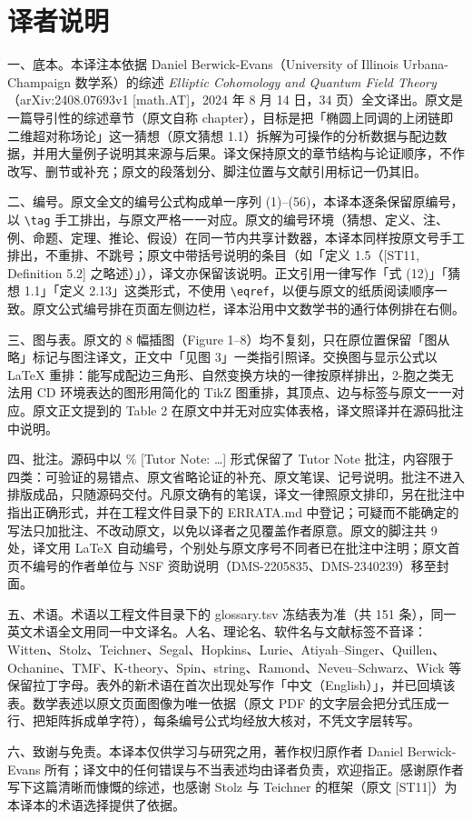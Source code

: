 \section*{译者说明}

一、底本。本译注本依据 Daniel Berwick-Evans（University of Illinois Urbana-Champaign 数学系）的综述 \textit{Elliptic Cohomology and Quantum Field Theory}（arXiv:2408.07693v1 [math.AT]，2024 年 8 月 14 日，34 页）全文译出。原文是一篇导引性的综述章节（原文自称 chapter），目标是把「椭圆上同调的上闭链即二维超对称场论」这一猜想（原文猜想 1.1）拆解为可操作的分析数据与配边数据，并用大量例子说明其来源与后果。译文保持原文的章节结构与论证顺序，不作改写、删节或补充；原文的段落划分、脚注位置与文献引用标记一仍其旧。

二、编号。原文全文的编号公式构成单一序列 (1)–(56)，本译本逐条保留原编号，以 \verb|\tag| 手工排出，与原文严格一一对应。原文的编号环境（猜想、定义、注、例、命题、定理、推论、假设）在同一节内共享计数器，本译本同样按原文号手工排出，不重排、不跳号；原文中带括号说明的条目（如「定义 1.5（[ST11, Definition 5.2] 之略述）」），译文亦保留该说明。正文引用一律写作「式 (12)」「猜想 1.1」「定义 2.13」这类形式，不使用 \verb|\eqref|，以便与原文的纸质阅读顺序一致。原文公式编号排在页面左侧边栏，译本沿用中文数学书的通行体例排在右侧。

三、图与表。原文的 8 幅插图（Figure 1–8）均不复刻，只在原位置保留「图从略」标记与图注译文，正文中「见图 3」一类指引照译。交换图与显示公式以 LaTeX 重排：能写成配边三角形、自然变换方块的一律按原样排出，2-胞之类无法用 CD 环境表达的图形用简化的 TikZ 图重排，其顶点、边与标签与原文一一对应。原文正文提到的 Table 2 在原文中并无对应实体表格，译文照译并在源码批注中说明。

四、批注。源码中以 \% [Tutor Note: …] 形式保留了 Tutor Note 批注，内容限于四类：可验证的易错点、原文省略论证的补充、原文笔误、记号说明。批注不进入排版成品，只随源码交付。凡原文确有的笔误，译文一律照原文排印，另在批注中指出正确形式，并在工程文件目录下的 ERRATA.md 中登记；可疑而不能确定的写法只加批注、不改动原文，以免以译者之见覆盖作者原意。原文的脚注共 9 处，译文用 LaTeX 自动编号，个别处与原文序号不同者已在批注中注明；原文首页不编号的作者单位与 NSF 资助说明（DMS-2205835、DMS-2340239）移至封面。

五、术语。术语以工程文件目录下的 glossary.tsv 冻结表为准（共 151 条），同一英文术语全文用同一中文译名。人名、理论名、软件名与文献标签不音译：Witten、Stolz、Teichner、Segal、Hopkins、Lurie、Atiyah–Singer、Quillen、Ochanine、TMF、K-theory、Spin、string、Ramond、Neveu–Schwarz、Wick 等保留拉丁字母。表外的新术语在首次出现处写作「中文（English）」，并已回填该表。数学表述以原文页面图像为唯一依据（原文 PDF 的文字层会把分式压成一行、把矩阵拆成单字符），每条编号公式均经放大核对，不凭文字层转写。

六、致谢与免责。本译本仅供学习与研究之用，著作权归原作者 Daniel Berwick-Evans 所有；译文中的任何错误与不当表述均由译者负责，欢迎指正。感谢原作者写下这篇清晰而慷慨的综述，也感谢 Stolz 与 Teichner 的框架（原文 [ST11]）为本译本的术语选择提供了依据。
